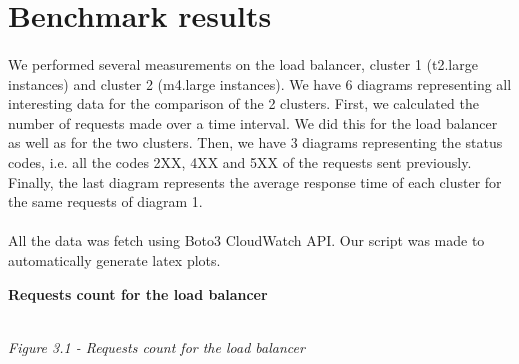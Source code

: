 \pagebreak
\section{Benchmark results} \label{T3}
\paragraph{} We performed several measurements on the load balancer, cluster 1 (t2.large instances) and cluster 2 (m4.large instances). We have 6 diagrams representing all interesting data for the comparison of the 2 clusters. First, we calculated the number of requests made over a time interval. We did this for the load balancer as well as for the two clusters. Then, we have 3 diagrams representing the status codes, i.e. all the codes 2XX, 4XX and 5XX of the requests sent previously. Finally, the last diagram represents the average response time of each cluster for the same requests of diagram 1.

\paragraph{} All the data was fetch using Boto3 CloudWatch API. Our script was made to automatically generate latex plots.


\begin{center}
    \textbf{Requests count for the load balancer}\break
    \\
    \emph{Figure 3.1 - Requests count for the load balancer}
\end{center}
